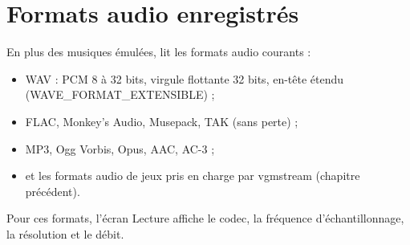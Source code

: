 \chapter{Formats audio enregistrés}
En plus des musiques émulées, \soft{} lit les formats audio courants :
\begin{itemize}
  \item WAV : PCM 8 à 32 bits, virgule flottante 32 bits, en-tête étendu (WAVE\_FORMAT\_EXTENSIBLE) ;
  \item FLAC, Monkey's Audio, Musepack, TAK (sans perte) ;
  \item MP3, Ogg Vorbis, Opus, AAC, AC-3 ;
  \item et les formats audio de jeux pris en charge par vgmstream (chapitre précédent).
\end{itemize}
Pour ces formats, l'écran Lecture affiche le codec, la fréquence d'échantillonnage, la résolution et le débit.
